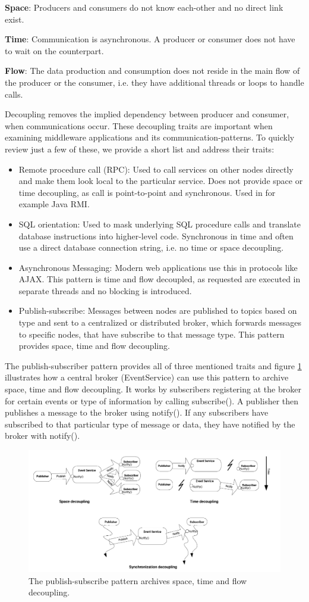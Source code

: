 \noindent \textbf{Space}: Producers and consumers do not know each-other and no direct link exist.

\noindent \textbf{Time}: Communication is asynchronous. A producer or consumer does not have to wait on the counterpart.

\noindent \textbf{Flow}: The data production and consumption does not reside in the main flow of the producer or the consumer, i.e. they have additional threads or loops to handle calls.

\noindent Decoupling removes the implied dependency between producer and consumer, when communications occur. These decoupling traits are important when examining middleware applications and its communication-patterns. To quickly review just a few of these, we provide a short list and address their traits:

\begin{itemize}
	\item Remote procedure call (RPC): Used to call services on other nodes directly and make them look local to the particular service. Does not provide space or time decoupling, as call is point-to-point and synchronous. Used in for example Java RMI.
	\item SQL orientation: Used to mask underlying SQL procedure calls and translate database instructions into higher-level code. Synchronous in time and often use a direct database connection string, i.e. no time or space decoupling.
	\item Asynchronous Messaging: Modern web applications use this in protocols like AJAX. This pattern is time and flow decoupled, as requested are executed in separate threads and no blocking is introduced.
	\item Publish-subscribe: Messages between nodes are published to topics based on type and sent to a centralized or distributed broker, which forwards messages to specific nodes, that have subscribe to that message type. This pattern provides space, time and flow decoupling.
\end{itemize}

\noindent The publish-subscriber pattern provides all of three mentioned traits and figure \ref{fig:pubsub} illustrates how a central broker (EventService) can use this pattern to archive space, time and flow decoupling. It works by subscribers registering at the broker for certain events or type of information by calling subscribe(). A publisher then publishes a message to the broker using notify(). If any subscribers have subscribed to that particular type of message or data, they have notified by the broker with notify().

\begin{figure}[h!]\label{}
	\centering
	\includegraphics[scale=0.5]{middleware/pubsub.png}
	\caption{The publish-subscribe pattern archives space, time and flow decoupling.}
	\label{fig:pubsub}
\end{figure}